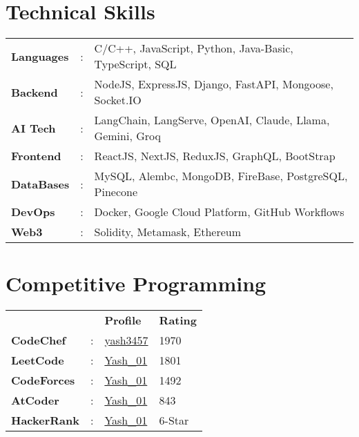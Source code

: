 \documentclass[letterpaper,11pt]{article}
\begin{document}
\begin{minipage}[t]{0.65\textwidth}
  \section{Technical Skills}
  \vspace{1pt}
  \begin{tabular}{>{\raggedright}p{2.1cm} p{0.3cm} p{9.8cm}}
    \textbf{\small{Languages}}  & : & \small{C/C++, JavaScript, Python, Java-Basic, TypeScript, SQL}     \\
    \textbf{\small{Backend}}    & : & \small{NodeJS, ExpressJS, Django, FastAPI, Mongoose, Socket.IO}    \\
    \textbf{\small{AI Tech}}    & : & \small{LangChain, LangServe, OpenAI, Claude, Llama, Gemini, Groq}  \\
    \textbf{\small{Frontend}}   & : & \small{ReactJS, NextJS, ReduxJS, GraphQL, BootStrap}               \\
    \textbf{\small{DataBases}}  & : & \small{MySQL, Alembc, MongoDB, FireBase, PostgreSQL, Pinecone}     \\
    \textbf{\small{DevOps}}     & : & \small{Docker, Google Cloud Platform, GitHub Workflows}            \\
    \textbf{\small{Web3}}       & : & \small{Solidity, Metamask, Ethereum}                               \\
  \end{tabular}
\end{minipage}
\hfill
\begin{minipage}[t]{0.32\textwidth}
  \section{Competitive Programming}
  \raggedleft
  \renewcommand{\arraystretch}{1.1}
  \begin{tabular}{>{\raggedright}p{2.3cm} p{0.3cm} P{1.7cm} P{1.7cm}}
    {}                          & {} & \textbf{\small{Profile}}                                                & \textbf{\small{Rating}}  \\
    \textbf{\small{CodeChef}}   & :  & {\href{https://www.codechef.com/users/yash3457}{{\small{yash3457}}}}    & \small{1970}             \\
    \textbf{\small{LeetCode}}   & :  & {\href{https://leetcode.com/u/Yash_01/}{{\small{Yash\_01}}}}            & \small{1801}             \\
    \textbf{\small{CodeForces}} & :  & {\href{https://codeforces.com/profile/Yash_01}{{\small{Yash\_01}}}}     & \small{1492}             \\
    \textbf{\small{AtCoder}}    & :  & {\href{https://atcoder.jp/users/Yash_01}{{\small{Yash\_01}}}}           & \small{843}              \\
    \textbf{\small{HackerRank}} & :  & {\href{https://www.hackerrank.com/profile/Yash_01}{{\small{Yash\_01}}}} & \small{6-Star}           \\
  \end{tabular}
\end{minipage}
\end{document}
